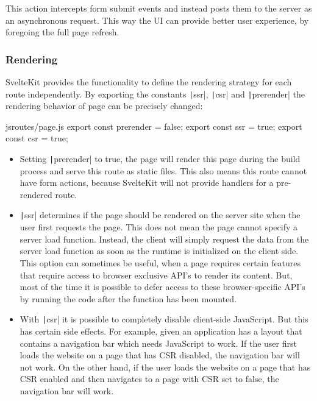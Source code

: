 \s{$}

This action intercepts form submit events and instead posts them to the server as an asynchronous request. This way the UI can provide better user experience, by foregoing the full page refresh. 
 
\subsubsection{Rendering}

SvelteKit provides the functionality to define the rendering strategy for each route independently.
By exporting the constants \texttt|ssr|, \texttt|csr| and \texttt|prerender| the rendering behavior of page can be precisely changed:
\begin{myminted}{js}{routes/page.js}
export const prerender = false;
export const ssr = true;
export const csr = true;
\end{myminted}

\begin{itemize}
    \item Setting \texttt|prerender| to true, the page will render this page during the build process and serve this route as static files. This also means this route cannot have form actions, because SvelteKit will not provide handlers for a pre-rendered route.
    \item \texttt|ssr| determines if the page should be rendered on the server site when the user first requests the page. This does not mean the page cannot specify a server load function. Instead, the client will simply request the data from the server load function as soon as the runtime is initialized on the client side. This option can sometimes be useful, when a page requires certain features that require access to browser exclusive API's to render its content. But, most of the time it is possible to defer access to these browser-specific API's by running the code after the function has been mounted. 
    \item With \texttt|csr| it is possible to completely disable client-side JavaScript. But this has certain side effects. For example, given an application has a layout that contains a navigation bar which needs JavaScript to work. If the user first loads the website on a page that has CSR disabled, the navigation bar will not work. On the other hand, if the user loads the website on a page that has CSR enabled and then navigates to a page with CSR set to false, the navigation bar will work. 
\end{itemize}